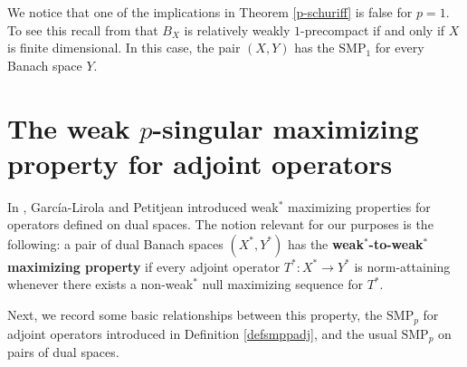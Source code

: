 \documentclass[12 pt]{article}%
\newtheorem{final remark}[theorem]{Final Remark}
\begin{document}
We notice that one of the implications in Theorem \ref{p-schuriff} is false for $p =1$. To see this recall from \cite[p. 45]{castillo} that $B_X$ is relatively weakly $1$-precompact if and only if $X$ is finite dimensional. In this case, 
the pair $(X, Y)$ has the $\mathrm{SMP}_1$ for every Banach space $Y$.




\section{The weak $p$-singular maximizing property for adjoint operators}



In \cite{garcia-lirola}, García-Lirola and Petitjean introduced weak$^\ast$ maximizing properties for operators defined on dual spaces. The notion relevant for our purposes is the following: a pair of dual Banach spaces $(X^\ast,Y^\ast)$ has the {\bf weak$^*$-to-weak$^*$ maximizing property} if every adjoint operator $T^*: X^* \to Y^*$ is norm-attaining whenever there exists a non-weak$^*$ null maximizing sequence for $T^*$.




Next, we record some basic relationships between this property, the $\mathrm{SMP}_p$ for adjoint operators introduced in Definition \ref{defsmppadj}, and the usual $\mathrm{SMP}_p$ on pairs of dual spaces.



\end{document}
